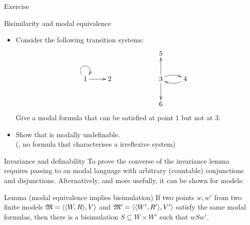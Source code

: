 \documentclass{beamer}
\begin{document}
\begin{slide}{Exercise}\label{s:32}
\small
\begin{exampleblock}{Bisimilarity and modal equivalence}
\begin{itemize}
\item Consider the following transition systems:
\begin{equation*}
\xymatrix{
&&& 5 &\\
1 \ar@(ul,ur)[]  \ar[r] & 2 & \hspace{0.3cm} & 3 \ar[u] \ar[d]  \ar@/^/[r]   & 4 \ar@/^/[l]  \\
&&& 6 &
}
\end{equation*}
Give a modal formula that can be satisfied at point $1$ but not at $3$.
\item Show that   is modally undefinable.
\\(\ie, no formula that characterises a irreflexive system)
\end{itemize}
\end{exampleblock}
\end{slide}

\begin{slide}{Invariance and definability}\label{s:33}
\small
To prove the converse of the invariance lemma requires passing to an  modal language  with arbitrary (countable) conjunctions and disjunctions. Alternatively, and more usefully, it can be shown  for  models:
\begin{block}{Lemma (modal equivalence implies bisimulation)}
If two points $w, w'$ from two finite models $\mathfrak{M} = \mathopen{\langle}\mathopen{\langle}W, R\mathclose{\rangle}, V\mathclose{\rangle}$ and $\mathfrak{M}' = \mathopen{\langle}\mathopen{\langle}W', R'\mathclose{\rangle}, V'\mathclose{\rangle}$ satisfy the same modal formulas, then there is a bisimulation
$S \subseteq W \times W'$  such that $w S w'$.
 \end{block}
\end{slide}
\end{document}
